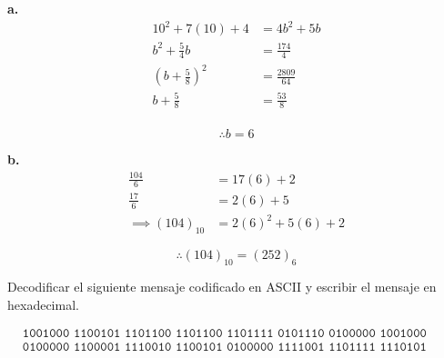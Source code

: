 \documentclass{article}
\newenvironment{problem}[2][Problema]{\begin{trivlist}
\item[\hskip \labelsep {\bfseries #1}\hskip \labelsep {\bfseries #2.}]}{\end{trivlist}}
\newenvironment{solution}[1][Solución]{\begin{trivlist}
\item[\hskip \labelsep {\bfseries #1:}]}{\end{trivlist}}
\begin{document}
\begin{solution}
\textbf{a.}
\begin{align*}
    10^{2} + 7(10) + 4                 & = 4b^{2} + 5b \\
    b^{2} + \frac{5}{4}b               & = \frac{174}{4} \\
    \left( b + \frac{5}{8} \right)^{2} & = \frac{2809}{64} \\
    b + \frac{5}{8}                    & = \frac{53}{8} \\
\end{align*}

\begin{equation*}
    \boxed{
        \therefore b = 6
    }
\end{equation*}

\textbf{b.}
\begin{align*}
    \frac{104}{6}       & = 17(6) + 2 \\
    \frac{17}{6}        & = 2(6) + 5 \\
    \implies (104)_{10} & = 2(6)^{2} + 5(6) + 2
\end{align*}

\begin{equation*}
    \boxed{
        \therefore (104)_{10} = (252)_{6}
    }
\end{equation*}
\end{solution}


\begin{problem}{3}
Decodificar el siguiente mensaje codificado en ASCII y escribir el mensaje en hexadecimal.

\begin{align*}
    &\texttt{1001000 1100101 1101100 1101100 1101111 0101110 0100000 1001000 1101111 1110111} \\ 
    &\texttt{0100000 1100001 1110010 1100101 0100000 1111001 1101111 1110101 0111111}
\end{align*}
\end{problem}
\end{document}
